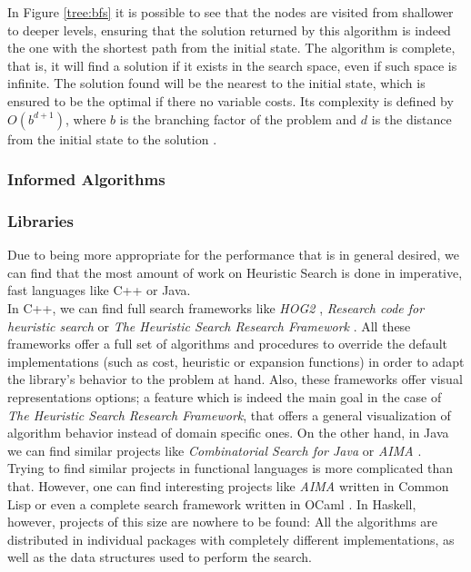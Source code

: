 In Figure \ref{tree:bfs} it is possible to see that the nodes are visited from
shallower to deeper levels, ensuring that the solution returned by this
algorithm is indeed the one with the shortest path from the initial state. The
algorithm is complete, that is, it will find a solution if it exists in the
search space, even if such space is infinite. The solution found will be the
nearest to the initial state, which is ensured to be the optimal if there no
variable costs. Its complexity is defined by $O(b^{d+1})$, where $b$ is the
branching factor of the problem and $d$ is the distance from the initial state
to the solution \cite{russel-2003-aima}.\\

\subsubsection{Informed Algorithms}

\subsubsection{Libraries}

Due to being more appropriate for the performance that is in general desired,
we can find that the most amount of work on Heuristic Search is done in
imperative, fast languages like C++ or Java.\\

In C++, we can find full search frameworks like \emph{HOG2} \cite{hog2},
\emph{Research code for heuristic search} \cite{cpp-search} or \emph{The
  Heuristic Search Research Framework} \cite{goldenberg-2017-framework}. All
these frameworks offer a full set of algorithms and procedures to override the
default implementations (such as cost, heuristic or expansion functions) in
order to adapt the library's behavior to the problem at hand. Also, these
frameworks offer visual representations options; a feature which is indeed the
main goal in the case of \emph{The Heuristic Search Research Framework}, that
offers a general visualization of algorithm behavior instead of domain specific
ones. On the other hand, in Java we can find similar projects like
\emph{Combinatorial Search for Java} \cite{cs4j} or \emph{AIMA}
\cite{java-aima}.\\

Trying to find similar projects in functional languages is more complicated
than that. However, one can find interesting projects like \emph{AIMA} written
in Common Lisp \cite{lisp-aima} or even a complete search framework written in
OCaml \cite{ocaml-search}. In Haskell, however, projects of this size are
nowhere to be found: All the algorithms are distributed in individual packages
with completely different implementations, as well as the data structures used
to perform the search.


